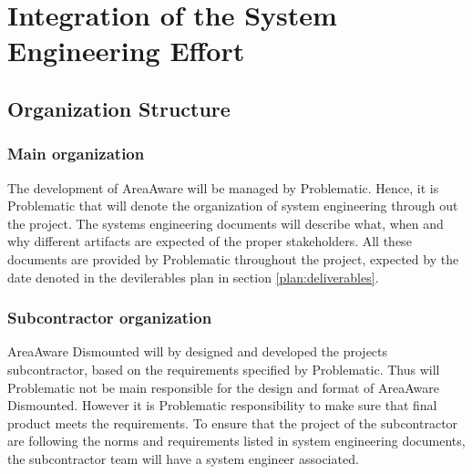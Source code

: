 %
\thispagestyle{fancy}
\chapter{Integration of the System Engineering Effort}
\label{chp:int_se_effort}

\section{Organization Structure}
\subsection{Main organization}
The development of AreaAware will be managed by Problematic.
Hence, it is Problematic that will denote the organization of system engineering through out the project.
The systems engineering documents will describe what, when and why different artifacts are expected of the proper stakeholders.
All these documents are provided by Problematic throughout the project, expected by the date denoted in the devilerables plan in section \ref{plan:deliverables}.\\


\subsection{Subcontractor organization}
\noindent AreaAware Dismounted will by designed and developed the projects subcontractor, based on the requirements specified by Problematic.
Thus will Problematic not be main responsible for the design and format of AreaAware Dismounted.
However it is Problematic responsibility to make sure that final product meets the requirements.
To ensure that the project of the subcontractor are following the norms and requirements listed in system engineering documents, the subcontractor team will have a system engineer associated.
